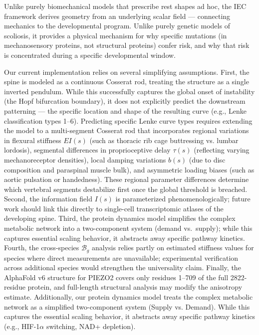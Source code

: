 \documentclass[11pt]{article}
\begin{document}
Unlike purely biomechanical models that prescribe rest shapes ad hoc, the IEC framework derives geometry from an underlying scalar field --- connecting mechanics to the developmental program. Unlike purely genetic models of scoliosis, it provides a physical mechanism for why specific mutations (in mechanosensory proteins, not structural proteins) confer risk, and why that risk is concentrated during a specific developmental window.

Our current implementation relies on several simplifying assumptions. First, the spine is modeled as a continuous Cosserat rod, treating the structure as a single inverted pendulum. While this successfully captures the global onset of instability (the Hopf bifurcation boundary), it does not explicitly predict the downstream patterning --- the specific location and shape of the resulting curve (e.g., Lenke classification types 1--6). Predicting specific Lenke curve types requires extending the model to a multi-segment Cosserat rod that incorporates regional variations in flexural stiffness $EI(s)$ (such as thoracic rib cage buttressing vs. lumbar lordosis), segmental differences in proprioceptive delay $\tau(s)$ (reflecting varying mechanoreceptor densities), local damping variations $b(s)$ (due to disc composition and paraspinal muscle bulk), and asymmetric loading biases (such as aortic pulsation or handedness). These regional parameter differences determine which vertebral segments destabilize first once the global threshold is breached. Second, the information field $I(s)$ is parameterized phenomenologically; future work should link this directly to single-cell transcriptomic atlases of the developing spine. Third, the protein dynamics model simplifies the complex metabolic network into a two-component system (demand vs.\ supply); while this captures essential scaling behavior, it abstracts away specific pathway kinetics. Fourth, the cross-species $\mathcal{B}_g$ analysis relies partly on estimated stiffness values for species where direct measurements are unavailable; experimental verification across additional species would strengthen the universality claim. Finally, the AlphaFold v6 structure for PIEZO2 covers only residues 1--709 of the full 2822-residue protein, and full-length structural analysis may modify the anisotropy estimate.
Additionally, our protein dynamics model treats the complex metabolic network as a simplified two-component system (Supply vs. Demand). While this captures the essential scaling behavior, it abstracts away specific pathway kinetics (e.g., HIF-1$\alpha$ switching, NAD+ depletion).
\end{document}
